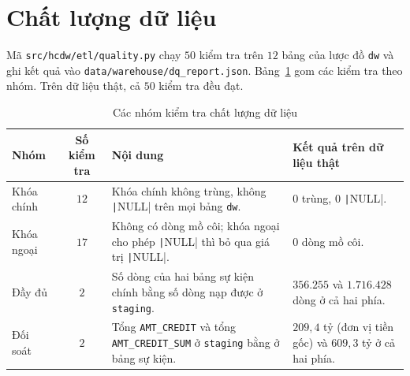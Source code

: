 \section{Chất lượng dữ liệu}
\label{sec:dq}
Mã \texttt{src/hcdw/etl/quality.py} chạy $50$ kiểm tra trên $12$ bảng của lược đồ \texttt{dw} và ghi kết quả vào \texttt{data/warehouse/dq\_report.json}. Bảng~\ref{tab:dq-results} gom các kiểm tra theo nhóm. Trên dữ liệu thật, cả $50$ kiểm tra đều đạt.

\begin{table}[H]
	\centering
	\caption{Các nhóm kiểm tra chất lượng dữ liệu}
	\label{tab:dq-results}
	\footnotesize
	\begin{tabular}{p{2.4cm} c p{6.4cm} p{4.6cm}}
		\toprule
		\textbf{Nhóm}       & \textbf{Số kiểm tra} & \textbf{Nội dung}                                                                                                                                                                                                             & \textbf{Kết quả trên dữ liệu thật}                             \\
		\midrule
		Khóa chính          & $12$                 & Khóa chính không trùng, không \texttt|NULL| trên mọi bảng \texttt{dw}.                                                                                                                       & $0$ trùng, $0$ \texttt|NULL|. \\
		Khóa ngoại          & $17$                 & Không có dòng mồ côi; khóa ngoại cho phép \texttt|NULL| thì bỏ qua giá trị \texttt|NULL|.                                                                   & $0$ dòng mồ côi.                                               \\
		Đầy đủ              & $2$                  & Số dòng của hai bảng sự kiện chính bằng số dòng nạp được ở \texttt{staging}.                                                                                                                                                  & $356.255$ và $1.716.428$ dòng ở cả hai phía.                   \\
		Đối soát            & $2$                  & Tổng \texttt{AMT\_CREDIT} và tổng \texttt{AMT\_CREDIT\_SUM} ở \texttt{staging} bằng ở bảng sự kiện.                                                                                                                           & $209{,}4$ tỷ (đơn vị tiền gốc) và $609{,}3$ tỷ ở cả hai phía.  \\

\end{tabular}
\end{table}
